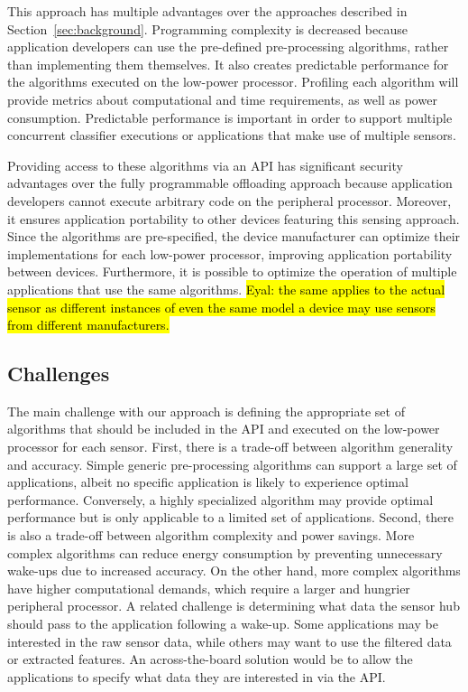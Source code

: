 This approach has multiple advantages over the approaches described in
Section~\ref{sec:background}. Programming complexity is decreased because application developers
can use the pre-defined pre-processing algorithms, rather than implementing
them themselves. It also creates predictable performance for the algorithms executed
on the low-power processor. Profiling each algorithm will provide metrics about computational
and time requirements, as well as power consumption. Predictable performance is important in
order to support multiple concurrent classifier executions or 
applications that make use of multiple sensors.

Providing access to these algorithms via an API has significant security
advantages over the fully programmable offloading approach because
application developers cannot execute arbitrary code on the peripheral 
processor. Moreover, it ensures application portability to other
devices featuring this sensing approach. Since the algorithms are pre-specified,
the device manufacturer can optimize their implementations for each
low-power processor, improving application portability between
devices. Furthermore, it is possible to optimize the operation of
multiple applications that use the same algorithms. \hl{Eyal: the same applies to the actual 
sensor as different instances of even the same model a device may use sensors from different manufacturers.}

\subsection{Challenges}

The main challenge with our approach is defining the
appropriate set of algorithms that should be included in the API and 
executed on the low-power processor for each sensor. First, there is a
trade-off between algorithm generality and accuracy.  Simple generic
pre-processing algorithms can support a large set of applications, albeit no specific
application is likely to experience optimal performance.  Conversely, a
highly specialized algorithm may provide optimal performance but is only
applicable to a limited set of applications.  Second, there is also a
trade-off between algorithm complexity and power savings.  More complex
algorithms can reduce energy consumption by preventing unnecessary
wake-ups due to increased accuracy. On the other hand, more complex
algorithms have higher computational demands, which require a larger and
hungrier peripheral processor. A related challenge is determining what data 
the sensor hub should pass to the application
following a wake-up. Some applications may be interested in the raw sensor data, while others
may want to use the filtered data or extracted features. An across-the-board solution would be
to allow the applications to specify what data they are interested in via the API.

